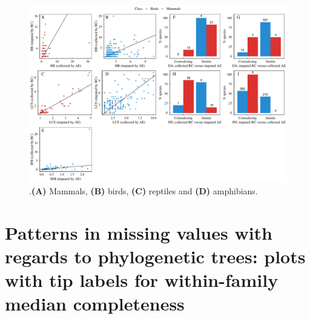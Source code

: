 \documentclass[11pt]{article}
\begin{document}
\begin{landscape}

\begin{figure}[h!]
\centering
\includegraphics[scale=0.6]{figures/Comparison_Cooke/Comparison_imputed_VS_collected}
\caption[]{\textbf{}.\textbf{(A)} Mammals, \textbf{(B)} birds, \textbf{(C)} reptiles and \textbf{(D)} amphibians.}
\label{compCooke}
\end{figure}

\end{landscape}

\pagebreak
\section{Patterns in missing values with regards to phylogenetic trees: plots with tip labels for within-family median completeness}
\end{document}
